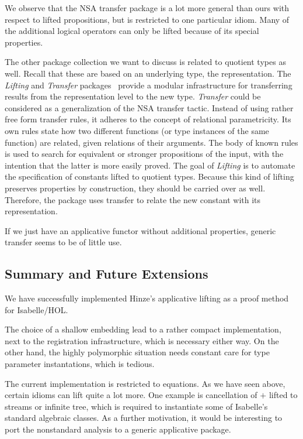 We observe that the NSA transfer package is a lot more general than ours with
respect to lifted propositions, but is restricted to one particular idiom.
Many of the additional logical operators can only be lifted because of its
special properties.

The other package collection we want to discuss is related to quotient types as
well.
Recall that these are based on an underlying type, the representation.
The \emph{Lifting} and \emph{Transfer} packages~\cite{huffman13} provide a
modular infrastructure for transferring results from the representation level
to the new type.
\emph{Transfer} could be considered as a generalization of the NSA transfer tactic.
Instead of using rather free form transfer rules, it adheres to the concept of
relational parametricity.
Its own rules state how two different functions (or type instances of the same
function) are related, given relations of their arguments.
The body of known rules is used to search for equivalent or stronger propositions
of the input, with the intention that the latter is more easily proved.
The goal of \emph{Lifting} is to automate the specification of constants lifted
to quotient types.
Because this kind of lifting preserves properties by construction, they should be
carried over as well.
Therefore, the package uses transfer to relate the new constant with its
representation.

If we just have an applicative functor without additional properties, generic
transfer seems to be of little use.
\todo


\subsection{Summary and Future Extensions}\label{subsec:summary-future}

We have successfully implemented Hinze's applicative lifting as a proof method
for Isabelle/HOL.
\todo

The choice of a shallow embedding lead to a rather compact implementation,
next to the registration infrastructure, which is necessary either way.
On the other hand, the highly polymorphic situation needs constant care for
type parameter instantations, which is tedious.

The current implementation is restricted to equations.
As we have seen above, certain idioms can lift quite a lot more.
One example is cancellation of $\plus$ lifted to streams or infinite tree,
which is required to instantiate some of Isabelle's standard algebraic classes.
As a further motivation, it would be interesting to port the nonstandard
analysis to a generic applicative package.
\todo

